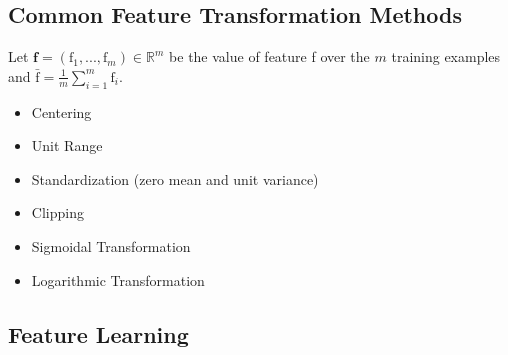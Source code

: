\documentclass{article}
\begin{document}
   \subsection{Common Feature Transformation Methods}
   Let $\textbf{f} = (\text{f}_1,...,\text{f}_m) \in \mathbb{R}^m$ be the value of feature f over the $m$ training examples and $\bar{\text{f}} = \frac{1}{m} \sum_{i=1}^m \text{f}_i$.
   \begin{itemize}
   \item Centering
   \item Unit Range
   \item Standardization (zero mean and unit variance)
   \item Clipping
   \item Sigmoidal Transformation
   \item Logarithmic Transformation
   \end{itemize}
   
   \subsection{Feature Learning}
   
   
   
   
\end{document}
